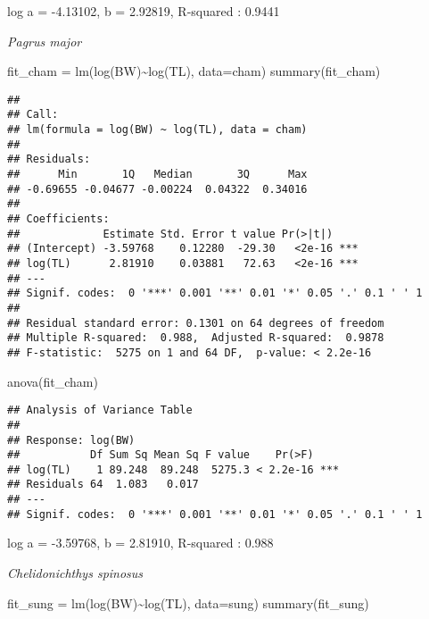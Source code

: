 \documentclass[
]{article}
\newenvironment{Shaded}{\begin{snugshade}}{\end{snugshade}}
\newcommand{\AttributeTok}[1]{\textcolor[rgb]{0.77,0.63,0.00}{#1}}
\newcommand{\FunctionTok}[1]{\textcolor[rgb]{0.00,0.00,0.00}{#1}}
\newcommand{\NormalTok}[1]{#1}
\newcommand{\OtherTok}[1]{\textcolor[rgb]{0.56,0.35,0.01}{#1}}
\newcommand{\SpecialCharTok}[1]{\textcolor[rgb]{0.00,0.00,0.00}{#1}}
\begin{document}
log a = -4.13102, b = 2.92819, R-squared : 0.9441

\emph{Pagrus major}

\begin{Shaded}
\begin{Highlighting}[]
\NormalTok{fit\_cham }\OtherTok{=} \FunctionTok{lm}\NormalTok{(}\FunctionTok{log}\NormalTok{(BW)}\SpecialCharTok{\textasciitilde{}}\FunctionTok{log}\NormalTok{(TL), }\AttributeTok{data=}\NormalTok{cham)}
\FunctionTok{summary}\NormalTok{(fit\_cham)}
\end{Highlighting}
\end{Shaded}

\begin{verbatim}
## 
## Call:
## lm(formula = log(BW) ~ log(TL), data = cham)
## 
## Residuals:
##      Min       1Q   Median       3Q      Max 
## -0.69655 -0.04677 -0.00224  0.04322  0.34016 
## 
## Coefficients:
##             Estimate Std. Error t value Pr(>|t|)    
## (Intercept) -3.59768    0.12280  -29.30   <2e-16 ***
## log(TL)      2.81910    0.03881   72.63   <2e-16 ***
## ---
## Signif. codes:  0 '***' 0.001 '**' 0.01 '*' 0.05 '.' 0.1 ' ' 1
## 
## Residual standard error: 0.1301 on 64 degrees of freedom
## Multiple R-squared:  0.988,  Adjusted R-squared:  0.9878 
## F-statistic:  5275 on 1 and 64 DF,  p-value: < 2.2e-16
\end{verbatim}

\begin{Shaded}
\begin{Highlighting}[]
\FunctionTok{anova}\NormalTok{(fit\_cham)}
\end{Highlighting}
\end{Shaded}

\begin{verbatim}
## Analysis of Variance Table
## 
## Response: log(BW)
##           Df Sum Sq Mean Sq F value    Pr(>F)    
## log(TL)    1 89.248  89.248  5275.3 < 2.2e-16 ***
## Residuals 64  1.083   0.017                      
## ---
## Signif. codes:  0 '***' 0.001 '**' 0.01 '*' 0.05 '.' 0.1 ' ' 1
\end{verbatim}

log a = -3.59768, b = 2.81910, R-squared : 0.988

\emph{Chelidonichthys spinosus}

\begin{Shaded}
\begin{Highlighting}[]
\NormalTok{fit\_sung }\OtherTok{=} \FunctionTok{lm}\NormalTok{(}\FunctionTok{log}\NormalTok{(BW)}\SpecialCharTok{\textasciitilde{}}\FunctionTok{log}\NormalTok{(TL), }\AttributeTok{data=}\NormalTok{sung)}
\FunctionTok{summary}\NormalTok{(fit\_sung)}
\end{Highlighting}
\end{Shaded}
\end{document}
